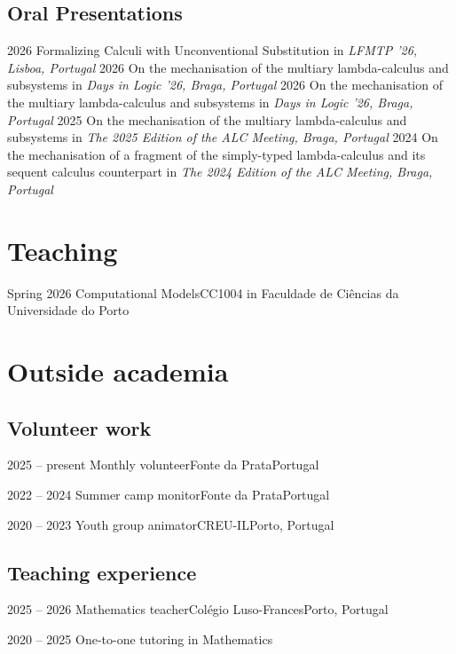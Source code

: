 \documentclass[11pt,a4paper]{moderncv}
\begin{document}
\subsection{Oral Presentations}
\cventry
	{2026}
	{Formalizing Calculi with Unconventional Substitution}{}
	{in \textit{LFMTP '26, Lisboa, Portugal}}{}{}
\cventry
	{2026}
	{On the mechanisation of the multiary lambda-calculus and subsystems}{}
	{in \textit{Days in Logic '26, Braga, Portugal}}{}{}
\cventry
	{2026}
	{On the mechanisation of the multiary lambda-calculus and subsystems}{}
	{in \textit{Days in Logic '26, Braga, Portugal}}{}{}
\cventry
	{2025}
	{On the mechanisation of the multiary lambda-calculus and subsystems}{}
	{in \textit{The 2025 Edition of the ALC Meeting, Braga, Portugal}}{}{}
\cventry
	{2024}
	{On the mechanisation of a fragment of the simply-typed lambda-calculus and its sequent calculus counterpart}{}
	{in \textit{The 2024 Edition of the ALC Meeting, Braga, Portugal}}{}{}



\section{Teaching}
\cventry
	{Spring 2026}
	{Computational Models}{CC1004}
	{in Faculdade de Ciências da Universidade do Porto}{}{}



\section{Outside academia}
\subsection{Volunteer work}
\cventry
	{2025 -- present}
	{Monthly volunteer}{Fonte da Prata}{Portugal}{}{}

\cventry
	{2022 -- 2024}
	{Summer camp monitor}{Fonte da Prata}{Portugal}{}{}

\cventry
	{2020 -- 2023}
	{Youth group animator}{CREU-IL}{Porto, Portugal}{}{}

\subsection{Teaching experience}
\cventry
	{2025 -- 2026}
	{Mathematics teacher}{Colégio Luso-Frances}{Porto, Portugal}{}{}

\cventry
	{2020 -- 2025}
	{One-to-one tutoring in Mathematics}{}{}{}{}
\end{document}
